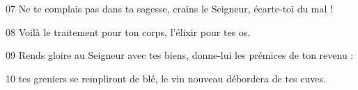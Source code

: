 
07 Ne te complais pas dans ta sagesse, crains le Seigneur, écarte-toi du mal !

08 Voilà le traitement pour ton corps, l’élixir pour tes os.

09 Rends gloire au Seigneur avec tes biens, donne-lui les prémices de ton revenu :

10 tes greniers se rempliront de blé, le vin nouveau débordera de tes cuves.
